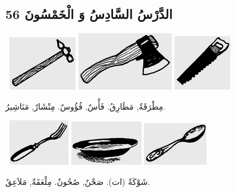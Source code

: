 \documentclass[a5paper]{article}
\begin{document}
\subsection{الدَّرْسُ السَّادِسُ وَ الْخَمْسُونَ 56}
\  \includegraphics[width=1.1563in,height=0.9165in]{images/MuhammadBagauddinprettified-img179.png}   \includegraphics[width=1.6354in,height=0.9898in]{images/MuhammadBagauddinprettified-img180.png}   \includegraphics[width=0.9791in,height=0.9374in]{images/MuhammadBagauddinprettified-img181.png} 

مِطْرَقَةٌ, مَطَارِقُ. فَأْسٌ, فُؤُوسٌ. مِنْشَارٌ, مَنَاشِيرُ. 

\  \includegraphics[width=1.0311in,height=0.7811in]{images/MuhammadBagauddinprettified-img182.png}   \includegraphics[width=1.2291in,height=0.7602in]{images/MuhammadBagauddinprettified-img183.png}   \includegraphics[width=1.0937in,height=0.7291in]{images/MuhammadBagauddinprettified-img184.png} 

شَوْكَةٌ (ات). صَحْنٌ, صُحُونٌ. مِلْعَقَةٌ, مَلاَعِقُ. 
\end{document}
